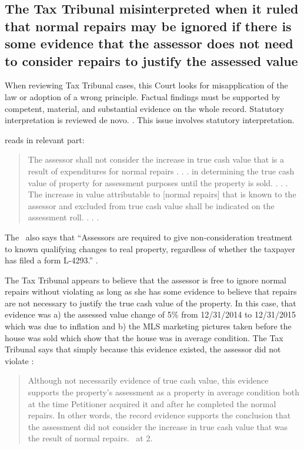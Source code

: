 \documentclass[12pt,\documentclassflag]{michiganCourtOfAppealsBrief}
\begin{document}
\subsection{The Tax Tribunal misinterpreted \mathieuGast when it ruled that normal repairs may be ignored if there is some evidence that the assessor does not need to consider repairs to justify the assessed value}

When reviewing Tax Tribunal cases, this Court looks for misapplication of the law or adoption of a wrong principle. Factual findings must be supported by competent, material, and substantial evidence on the whole record. Statutory interpretation is reviewed de novo. . This issue involves statutory interpretation.

\mathieuGast reads in relevant part:

\begin{quote}
	The assessor shall not consider the increase in true cash value that is a result of expenditures for normal repairs . . . in determining the true cash value of property for assessment purposes until the property is sold. . . . The increase in value attributable to [normal repairs] that is known to the assessor and excluded from true cash value shall be indicated on the assessment roll. . . .
\end{quote}

The \STC\ also says that ``Assessors are required to give non-consideration treatment to known qualifying changes to real property, regardless of whether the taxpayer has filed a form L-4293.'' .

The Tax Tribunal appears to believe that the assessor is free to ignore normal repairs without violating \mathieuGast as long as she has some evidence to believe that repairs are not necessary to justify the true cash value of the property. In this case, that evidence was a) the assessed value change of 5\% from 12/31/2014 to 12/31/2015 which was due to inflation and b) the MLS marketing pictures taken before the house was sold which show that the house was in average condition. The Tax Tribunal says that simply because this evidence existed, the assessor did not violate \mathieuGast: 

\begin{quote}
	Although not necessarily evidence of true cash value, this evidence supports the property's assessment as a property in average condition both at the time Petitioner acquired it and after he completed the normal repairs. In other words, the record evidence supports the conclusion that the assessment did not consider the increase in true cash value that was the result of normal repairs. \orderDenying\ at 2. 
\end{quote}
 
\end{document}
